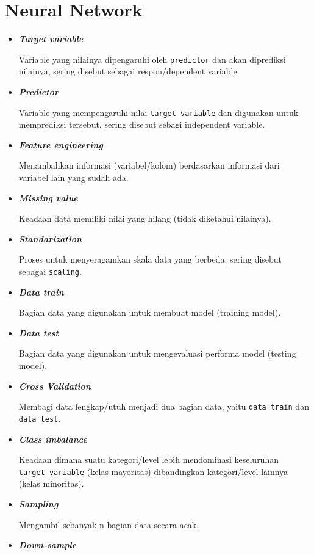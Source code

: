 \documentclass[
]{article}
\author{}
\date{\vspace{-2.5em}}
\begin{document}
\hypertarget{neural-network}{%
\section{Neural Network}\label{neural-network}}

\begin{itemize}
\item
  \textbf{\emph{Target variable }}

  Variable yang nilainya dipengaruhi oleh \texttt{predictor} dan akan
  diprediksi nilainya, sering disebut sebagai respon/dependent variable.
\item
  \textbf{\emph{Predictor}}

  Variable yang mempengaruhi nilai \texttt{target\ variable} dan
  digunakan untuk memprediksi tersebut, sering disebut sebagi
  independent variable.
\item
  \textbf{\emph{Feature engineering}}

  Menambahkan informasi (variabel/kolom) berdasarkan informasi dari
  variabel lain yang sudah ada.
\item
  \textbf{\emph{Missing value}}

  Keadaan data memiliki nilai yang hilang (tidak diketahui nilainya).
\item
  \textbf{\emph{Standarization}}

  Proses untuk menyeragamkan skala data yang berbeda, sering disebut
  sebagai \texttt{scaling}.
\item
  \textbf{\emph{Data train}}

  Bagian data yang digunakan untuk membuat model (training model).
\item
  \textbf{\emph{Data test}}

  Bagian data yang digunakan untuk mengevaluasi performa model (testing
  model).
\item
  \textbf{\emph{Cross Validation}}

  Membagi data lengkap/utuh menjadi dua bagian data, yaitu
  \texttt{data\ train} dan \texttt{data\ test}.
\item
  \textbf{\emph{Class imbalance}}

  Keadaan dimana suatu kategori/level lebih mendominasi keseluruhan
  \texttt{target\ variable} (kelas mayoritas) dibandingkan
  kategori/level lainnya (kelas minoritas).
\item
  \textbf{\emph{Sampling}}

  Mengambil sebanyak n bagian data secara acak.
\item
  \textbf{\emph{Down-sample}}


\end{itemize}
\end{document}
